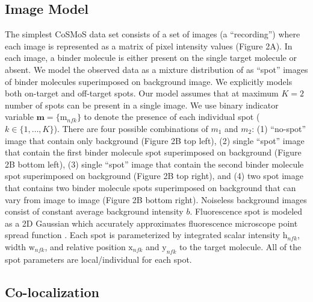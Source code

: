 \subsection{Image Model} 

The simplest CoSMoS data set consists of a set of images (a “recording”) where each image is represented as a matrix of pixel intensity values (Figure 2A). In each image, a binder molecule is either present on the single target molecule or absent. We model the observed data as a mixture distribution of  as “spot” images of binder molecules superimposed on background image. We explicitly models both on-target and off-target spots. Our model assumes that at maximum $K=2$ number of spots can be present in a single image. We use binary indicator variable $\mathbf{m} = \{\mathrm{m}_{nfk}\}$ to denote the presence of each individual spot ($k \in \{1,\dots,K\}$). There are four possible combinations of $m_1$ and $m_2$: (1) “no-spot” image that contain only background (Figure 2B top left), (2) single “spot” image that contain the first binder molecule spot superimposed on background (Figure 2B bottom left), (3) single “spot” image that contain the second binder molecule spot superimposed on background (Figure 2B top right), and (4) two spot image that contains two binder molecule spots superimposed on background that can vary from image to image (Figure 2B bottom right).  Noiseless background images consist of constant average background intensity $b$. Fluorescence spot is modeled as a 2D Gaussian which accurately approximates fluorescence microscope point spread function \cite{Zhang2007-rb}. Each spot is parameterized by integrated scalar intensity $\mathrm{h}_{nfk}$, width $\mathrm{w}_{nfk}$, and relative position $\mathrm{x}_{nfk}$ and $\mathrm{y}_{nfk}$ to the target molecule. All of the spot parameters are local/individual for each spot. %

\subsection{Co-localization}

